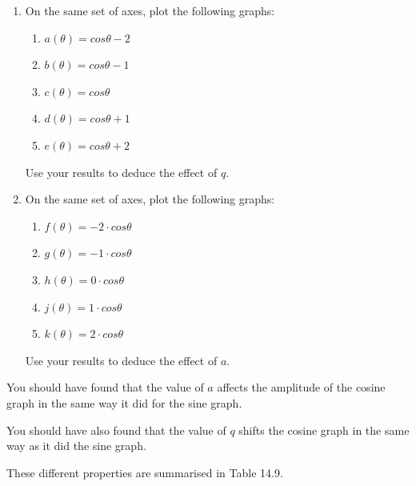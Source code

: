 \label{m39414*id87553}\begin{enumerate}[noitemsep, label=\textbf{\arabic*}. ] 
\label{m39414*uid53}\item On the same set of axes, plot the following graphs:
\label{m39414*id87568}\begin{enumerate}[noitemsep, label=\textbf{\alph*}. ] 
\label{m39414*uid54}\item $a\left(\theta \right)=cos\theta -2$\label{m39414*uid55}\item $b\left(\theta \right)=cos\theta -1$\label{m39414*uid56}\item $c\left(\theta \right)=cos\theta $\label{m39414*uid57}\item $d\left(\theta \right)=cos\theta +1$\label{m39414*uid58}\item $e\left(\theta \right)=cos\theta +2$\end{enumerate}
Use your results to deduce the effect of $q$.
\label{m39414*uid59}\item On the same set of axes, plot the following graphs:
\label{m39414*id87790}\begin{enumerate}[noitemsep, label=\textbf{\alph*}. ] 
\label{m39414*uid60}\item $f\left(\theta \right)=-2\ensuremath{\cdot}cos\theta $\label{m39414*uid61}\item $g\left(\theta \right)=-1\ensuremath{\cdot}cos\theta $\label{m39414*uid62}\item $h\left(\theta \right)=0\ensuremath{\cdot}cos\theta $\label{m39414*uid63}\item $j\left(\theta \right)=1\ensuremath{\cdot}cos\theta $\label{m39414*uid64}\item $k\left(\theta \right)=2\ensuremath{\cdot}cos\theta $\end{enumerate}
Use your results to deduce the effect of $a$.
\end{enumerate}
\label{m39414*id88024}You should have found that the value of $a$ affects the amplitude of the cosine graph in the same way it did for the sine graph.\par 
\label{m39414*id88038}You should have also found that the value of $q$ shifts the cosine graph in the same way as it did the sine graph.\par 
\label{m39414*id88050}These different properties are summarised in Table 14.9.\par 
